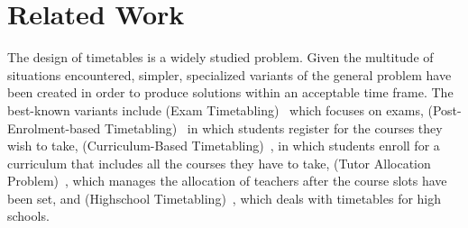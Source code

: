 \section{Related Work}
\label{sec:state-of-art}

The design of timetables is a widely studied problem. Given the multitude of situations encountered, simpler, specialized variants of the general problem have been created in order to produce solutions within an acceptable time frame.
The best-known variants include \ETT{} (Exam Timetabling)~\cite{2021_bellio_COR,2021_gorgos_SEEDA} which focuses on exams, \PETT{} (Post-Enrolment-based Timetabling)~\cite{ 2018_nagata_COR,2019_goh_JORS} in which students register for the courses they wish to take, \CBTT{} (Curriculum-Based Timetabling)~\cite{2010_hao_EJOR,2012_abdullah_IS,2016_kiefer_AOR}, in which students enroll for a curriculum that includes all the courses they have to take, \TAP{} (Tutor Allocation Problem)~\cite{2022_caselli_ESWA}, which manages the allocation of teachers after the course slots have been set, and \HTT{} (Highschool Timetabling)~\cite{2016_Kingston_AOR, 2018_stuckey_CPAIOR}, which deals with timetables for high schools.

